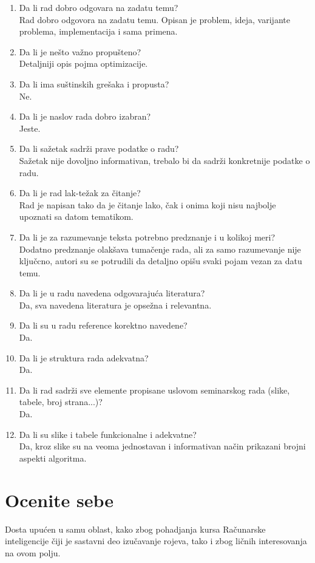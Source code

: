 \documentclass[a4paper]{report}
\begin{document}
\begin{enumerate}
\item Da li rad dobro odgovara na zadatu temu?\\
{Rad dobro odgovora na zadatu temu. Opisan je problem, ideja, varijante problema, implementacija i sama primena.}
\item Da li je nešto važno propušteno?\\
{Detaljniji opis pojma optimizacije.}
\item Da li ima suštinskih grešaka i propusta?\\
{Ne.}
\item Da li je naslov rada dobro izabran?\\ 
{ Jeste. }
\item Da li sažetak sadrži prave podatke o radu?\\ 
{Sažetak nije dovoljno informativan, trebalo bi da sadrži konkretnije podatke o radu. }
\item Da li je rad lak-težak za čitanje?\\ 
{Rad je napisan tako da je čitanje lako, čak i onima koji nisu najbolje upoznati sa datom tematikom.}
\item Da li je za razumevanje teksta potrebno predznanje i u kolikoj meri?\\
{Dodatno predznanje olakšava tumačenje rada, ali za samo razumevanje nije ključcno, autori su se potrudili da detaljno opišu svaki pojam vezan za datu temu.}
\item Da li je u radu navedena odgovarajuća literatura?\\ 
{Da, sva navedena literatura je opsežna i relevantna. }
\item Da li su u radu reference korektno navedene?\\ 
{Da.}
\item Da li je struktura rada adekvatna?\\
{Da.}
\item Da li rad sadrži sve elemente propisane uslovom seminarskog rada (slike, tabele, broj strana...)?\\
{Da.}
\item Da li su slike i tabele funkcionalne i adekvatne?\\
{Da, kroz slike su na veoma jednostavan i informativan način prikazani brojni aspekti algoritma.}
\end{enumerate}

\section{Ocenite sebe}
{Dosta upućen u samu oblast, kako zbog pohadjanja kursa Računarske inteligencije čiji je sastavni deo izučavanje rojeva, tako i zbog ličnih interesovanja na ovom polju.}
\end{document}
